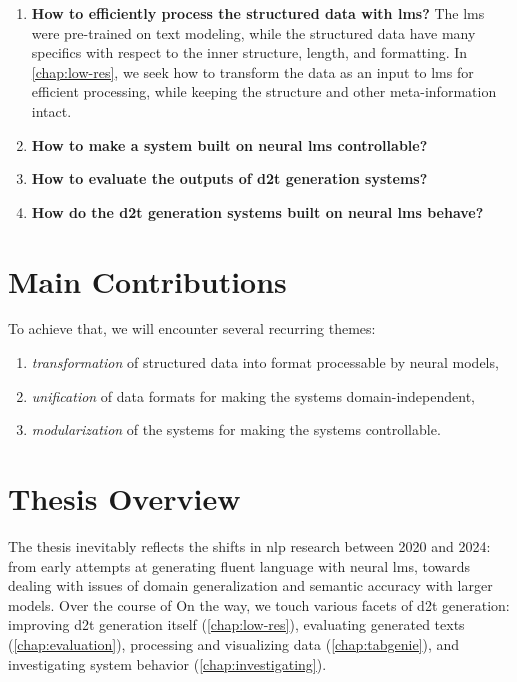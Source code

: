\documentclass[12pt,notitlepage,a4paper,openright]{report}
\begin{document}
\begin{enumerate}
  \item \textbf{How to efficiently process the structured data with \acp{lm}?} The \acp{lm} were pre-trained on text modeling, while the structured data have many specifics with respect to the inner structure, length, and formatting. In \autoref{chap:low-res}, we seek how to transform the data as an input to \acp{lm} for efficient processing, while keeping the structure and other meta-information intact.
  \item \textbf{How to make a system built on neural \acp{lm} controllable?}
  \item \textbf{How to evaluate the outputs of \ac{d2t} generation systems?}
  \item \textbf{How do the \ac{d2t} generation systems built on neural \acp{lm} behave?}
\end{enumerate}



\section{Main Contributions}
\label{sec:contributions}


To achieve that, we will encounter several recurring themes:
\begin{enumerate}
  \item \textit{transformation} of structured data into format processable by neural models,
  \item \textit{unification} of data formats for making the systems domain-independent,
  \item \textit{modularization} of the systems for making the systems controllable.
\end{enumerate}



\section{Thesis Overview}
\label{sec:overview}


The thesis inevitably reflects the shifts in \ac{nlp} research between 2020 and 2024: from early attempts at generating fluent language with neural \acp{lm}, towards dealing with issues of domain generalization and semantic accuracy with larger models.
Over the course of
On the way, we touch various facets of \ac{d2t} generation: improving \ac{d2t} generation itself (\autoref{chap:low-res}), evaluating generated texts (\autoref{chap:evaluation}), processing and visualizing data (\autoref{chap:tabgenie}), and investigating system behavior (\autoref{chap:investigating}).
\end{document}
